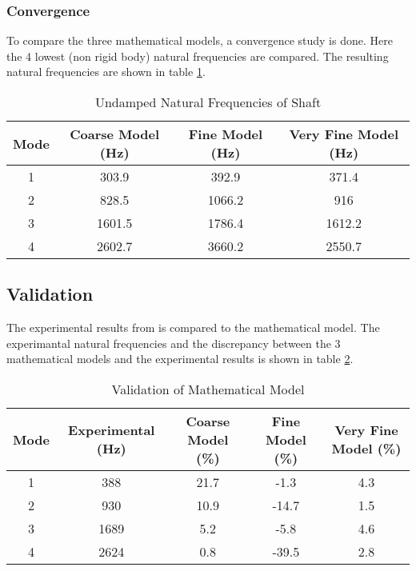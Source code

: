 \subsubsection{Convergence}
To compare the three mathematical models, a convergence study is done. Here the 4 lowest (non rigid body) natural frequencies are compared.
The resulting natural frequencies are shown in table \ref{tab:natural_freq}.
\begin{table}[htbp]
    \centering
    \caption{Undamped Natural Frequencies of Shaft}
    \label{tab:natural_freq}
    \begin{tabular}{@{}cccc@{}}
        \toprule
        Mode    &   Coarse Model (\si{\hertz})    &   Fine Model (\si{\hertz})  &   Very Fine Model (\si{\hertz}) \\ \midrule
        1       &   303.9   &   392.9   &   371.4   \\
        2       &   828.5   &   1066.2  &   916     \\
        3       &   1601.5  &   1786.4  &   1612.2  \\
        4       &   2602.7  &   3660.2  &   2550.7  \\ \bottomrule
    \end{tabular}
\end{table}

\subsection{Validation}
The experimental results from \cite[6]{Problem} is compared to the mathematical model. The experimantal natural frequencies and the discrepancy between the 3 mathematical models and the experimental results is shown in table \ref{tab:validation}.

\begin{table}[htbp]
    \centering
    \caption{Validation of Mathematical Model}
    \label{tab:validation}
    \begin{tabular}{@{}ccccc@{}}
        \toprule
        Mode    &   Experimental (\si{\hertz})    &   Coarse Model (\si{\percent})    &   Fine Model (\si{\percent})  &   Very Fine Model (\si{\percent}) \\ \midrule
        1       &   388     &   21.7   &   -1.3   &   4.3   \\
        2       &   930     &   10.9   &   -14.7  &   1.5     \\
        3       &   1689    &   5.2  &   -5.8  &   4.6  \\
        4       &   2624    &   0.8  &   -39.5  &   2.8  \\ \bottomrule
    \end{tabular}
\end{table}


